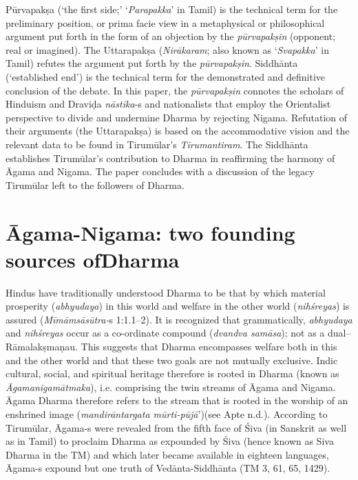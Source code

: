 Pūrvapakṣa (‘the first side;’ ‘\textit{Parapakka}’ in Tamil) is the technical term for the preliminary position, or prima facie view in a metaphysical or philosophical argument put forth in the form of an objection by the \textit{pūrvapakṣin} (opponent; real or imagined). The Uttarapakṣa (\textit{Nirākaram}; also known as ‘\textit{Svapakka}’ in Tamil) refutes the argument put forth by the \textit{pūrvapakṣin}. Siddhānta (‘established end’) is the technical term for the demonstrated and definitive conclusion of the debate. In this paper, the \textit{pūrvapakṣin} connotes the scholars of Hinduism and Draviḍa \textit{nāstika}-s and nationalists that employ the Orientalist perspective to divide and undermine Dharma by rejecting Nigama. Refutation of their arguments (the Uttarapakṣa) is based on the accommodative vision and the relevant data to be found in Tirumūlar’s \textit{Tirumantiram}. The Siddhānta establishes Tirumūlar’s contribution to Dharma in reaffirming the harmony of Āgama and Nigama. The paper concludes with a discussion of the legacy Tirumūlar left to the followers of Dharma.


\section*{Āgama-Nigama: two founding sources of\hfill \break Dharma}

Hindus have traditionally understood Dharma to be that by which material prosperity (\textit{abhyudaya}) in this world and welfare in the other world (\textit{nihśreyas}) is assured (\textit{Mīmāmsāsūtra-}s 1:1.1–2). It is recognized that grammatically, \textit{abhyudaya} and \textit{nihśreyas} occur as a co-ordinate compound (\textit{dvandva samāsa}); not as a dual--Rāmalakṣmaṇau. This suggests that Dharma encompasses welfare both in this and the other world and that these two goals are not mutually exclusive. Indic cultural, social, and spiritual heritage therefore is rooted in Dharma (known as \textit{Āgamanigamātmaka}), i.e. comprising the twin streams of Āgama and Nigama. Āgama Dharma therefore refers to the stream that is rooted in the worship of an enshrined image (\textit{mandirāntargata mūrti-pūjā}’)(see Apte n.d.). According to Tirumūlar, Āgama-s were revealed from the fifth face of Śiva (in Sanskrit as well as in Tamil) to proclaim Dharma as expounded by Śiva (hence known as Siva Dharma in the TM) and which later became available in eighteen languages, Āgama-s expound but one truth of Vedānta-Siddhānta (TM 3, 61, 65, 1429).

